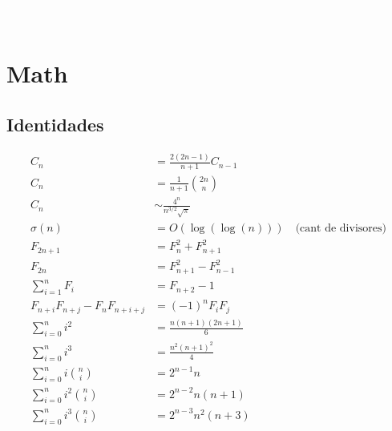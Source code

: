 


\def\title{Universidad Nacional de Rosario - Don Gato}
\textcolor{white}{.}\\[0.2cm]
 \\[0.5cm]
\tableofcontents\newpage

\section{Math}
\subsection{Identidades}
\begin{align*}
	C_n &= \frac{2(2n-1)}{n+1} C_{n-1} \\
	C_n &= \frac{1}{n+1} \binom{2n}{n} \\
	C_n &\sim \frac{4^n}{n^{3/2}\sqrt{\pi}} \\
	\sigma(n) &= O(\log(\log(n))) \:\:\:\text{ (cant de divisores)}\\
	F_{2n+1} &= F_{n}^2 + F_{n+1}^2 \\
	F_{2n} &= F_{n+1}^2 - F_{n-1}^2 \\
	\sum_{i=1}^n F_i &= F_{n+2}-1 \\
	F_{n+i}F_{n+j} - F_nF_{n+i+j} &= (-1)^n F_iF_j \\
	\sum_{i=0}^n i^2 &= \frac{n(n+1)(2n+1)}{6} \\
	\sum_{i=0}^n i^3 &= \frac{n^2(n+1)^2}{4} \\
	\sum_{i=0}^n i \binom n i &= 2^{n - 1}n \\
	\sum_{i=0}^n i^2 \binom n i &= 2^{n - 2}n(n+1) \\
	\sum_{i=0}^n i^3 \binom n i &= 2^{n - 3}n^2(n+3) \\
\end{align*}


